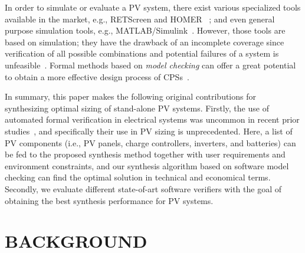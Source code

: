 \documentclass[10pt,conference]{IEEEtran}
\begin{document}
In order to simulate or evaluate a PV system, there exist various specialized tools available in the market, e.g., RETScreen and HOMER~\cite{Pradhan,Swarnkar}%
; and even general purpose simulation tools, e.g., MATLAB/Simulink~\cite{Gow1999}. %
 However, those tools are based on simulation; they have the drawback of an incomplete coverage  since verification of all possible combinations and potential failures of a system is unfeasible~\cite{ClarkeHV18}.
Formal methods based on \textit{model checking} can offer a great potential to obtain a more effective design process of CPSs~\cite{ClarkeHV18}. 

In summary, this paper makes the following original contributions for synthesizing optimal sizing of stand-alone PV systems.
Firstly, the use of automated formal verification in electrical systems was uncommon in recent prior studies~\cite{abs-1811-09438}, 
and specifically their use in PV sizing is unprecedented. Here, a list of PV components (i.e., PV panels, charge controllers, inverters, and batteries) 
can be fed to the proposed synthesis method together with user requirements and environment constraints, 
and our synthesis algorithm based on software model checking can find the optimal solution in technical and economical terms.
Secondly, we evaluate different state-of-art software verifiers with the goal of obtaining the best synthesis performance for PV systems.
%
%
\section{BACKGROUND}
\label{sec:AutomatedVerification}
\end{document}

